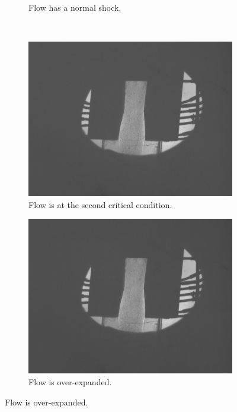 \begin{figure}[htpb]
\begin{subfigure}{0.47\textwidth}
        \caption{Flow has a normal shock.}
        \label{fig:schlieren_normal_shock}
    \end{subfigure} \\
    \begin{subfigure}{0.47\textwidth}
        \centering
        \includegraphics[width=\textwidth]{Figures/4-2nd_critical_condition.png}
        \caption{Flow is at the second critical condition.}
        \label{fig:schlieren_second_critical}
    \end{subfigure}
    \begin{subfigure}{0.47\textwidth}
        \centering
        \includegraphics[width=\textwidth]{Figures/3-over-expanded_flow.png}
        \caption{Flow is over-expanded.}

\end{subfigure}
\end{figure}

